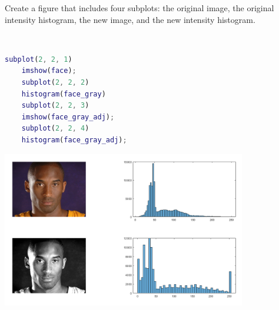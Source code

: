 Create a figure that includes four subplots: the original image, the original intensity histogram, the new image, and the new intensity histogram.


\begin{solution}\ 
    \begin{lstlisting}[language=Matlab]
    subplot(2, 2, 1)
    imshow(face);
    subplot(2, 2, 2)
    histogram(face_gray)
    subplot(2, 2, 3)
    imshow(face_gray_adj);
    subplot(2, 2, 4)
    histogram(face_gray_adj);
    \end{lstlisting}

    \begin{center}
        \includegraphics[width=0.8\textwidth]{img/e7p8d.png}
    \end{center}
\end{solution}